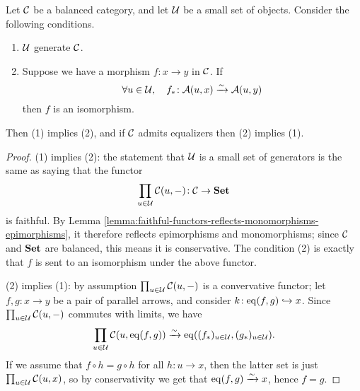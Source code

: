 \begin{lemma}\label{lemma:generators-in-balanced-categories-detect-isomorphisms}
	Let \(\mathcal{C}\) be a balanced category, and let \(\mathcal{U}\) be a small set of objects. Consider the following conditions.
	\begin{enumerate}[label=(\arabic*)]
	\item \(\mathcal{U}\) generate \(\mathcal{C}\).
	\item Suppose we have a morphism \(f\!:x\to y\) in \(\mathcal{C}\). If
	\[ \forall u\in\mathcal{U},\quad f_*\!:\mathcal{A}(u,x)\xrightarrow{\sim}\mathcal{A}(u,y) \]
	then \(f\) is an isomorphism.
	\end{enumerate}
	Then (1) implies (2), and if \(\mathcal{C}\) admits equalizers then (2) implies (1).
\end{lemma}
\begin{proof}
(1) implies (2): the statement that \(\mathcal{U}\) is a small set of generators is the same as saying that the functor
\[ \prod_{u\in\mathcal{U}}\mathcal{C}(u,-)\!:\mathcal{C}\to\mathbf{Set} \]
is faithful. By Lemma \ref{lemma:faithful-functors-reflects-monomorphisms-epimorphisms}, it therefore reflects epimorphisms and monomorphisms; since \(\mathcal{C}\) and \(\mathbf{Set}\) are balanced,
this means it is conservative. The condition (2) is exactly that \(f\) is sent to an isomorphism under the above functor.

(2) implies (1): by assumption \(\prod_{u\in\mathcal{U}}\mathcal{C}(u,-)\) is a convervative functor; let \(f,g\!:x\to y\) be a pair of parallel arrows, and consider \(k\!:\operatorname{eq}(f,g)\hookrightarrow x\).
Since \(\prod_{u\in\mathcal{U}}\mathcal{C}(u,-)\) commutes with limits, we have
\[ \prod_{u\in\mathcal{U}}\mathcal{C}(u,\operatorname{eq}(f,g)) \xrightarrow{\sim} \operatorname{eq}((f_*)_{u\in\mathcal{U}},(g_*)_{u\in\mathcal{U}}). \]
If we assume that \(f\circ h = g\circ h\) for all \(h\!:u\to x\), then the latter set is just \(\prod_{u\in\mathcal{U}}\mathcal{C}(u,x)\), so by conservativity we get that
\(\operatorname{eq}(f,g)\xrightarrow{\sim} x\), hence \(f=g\).
\end{proof}


